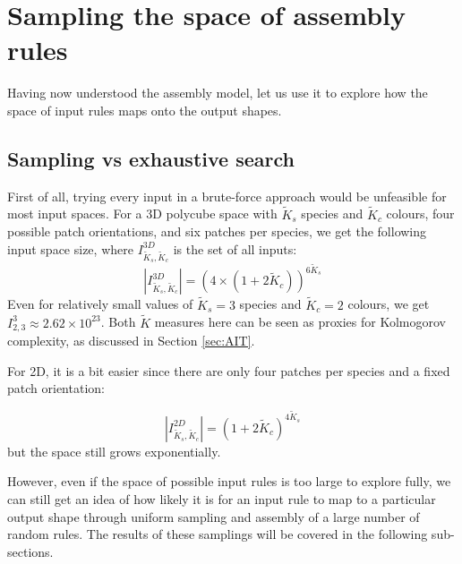 \section{Sampling the space of assembly rules}
Having now understood the assembly model, let us use it to explore how the space of input rules maps onto the output shapes. 

\subsection{Sampling vs exhaustive search}
First of all, trying every input in a brute-force approach would be unfeasible for most input spaces. For a 3D polycube space with \(\widetilde{K}_s\) species and \(\widetilde{K}_c\) colours, four possible patch orientations, and six patches per species, we get the following input space size, where \(I_{\widetilde{K}_s, \widetilde{K}_c}^{3D}\) is the set of all inputs:
\begin{equation}\label{eq:inputSize3D}
\left\lvert I_{\widetilde{K}_s, \widetilde{K}_c}^{3D}\right\rvert = (4 \times (1+2\widetilde{K}_c))^{6\widetilde{K}_s}
\end{equation} 
Even for relatively small values of \(\widetilde{K}_s=3\) species and \(\widetilde{K}_c=2\) colours, we get \(I_{2, 3}^3 \approx 2.62 \times 10^{23}\). Both \(\widetilde{K}\) measures here can be seen as proxies for Kolmogorov complexity, as discussed in Section \ref{sec:AIT}.

For 2D, it is a bit easier since there are only four patches per species and a fixed patch orientation:

\begin{equation}\label{eq:inputSize2D}
\left\lvert I_{\widetilde{K}_s, \widetilde{K}_c}^{2D}\right\rvert = (1+2\widetilde{K}_c)^{4\widetilde{K}_s}
\end{equation} but the space still grows exponentially.

However, even if the space of possible input rules is too large to explore fully, we can still get an idea of how likely it is for an input rule to map to a particular output shape through uniform sampling and assembly of a large number of random rules. The results of these samplings will be covered in the following sub-sections. 


